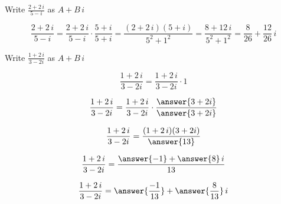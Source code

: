 \documentclass{ximera}
\begin{document}
\begin{example}




Write $\frac{2 + 2 \, i}{5 - i}$ as $A + B \, i$


\begin{explanation}

\[
\frac{2 + 2 \, i}{5 - i} = \frac{2 + 2 \, i}{5 - i} \cdot \frac{5 + i}{5 + i} = \frac{(2 + 2 \, i)(5 + i)}{5^2 + 1^2} = \frac{8 + 12 \, i}{5^2 + 1^2} = \frac{8}{26} + \frac{12}{26} \, i
\]


\end{explanation}


\end{example}










\begin{question}


Write $\frac{1 + 2 \, i}{3 - 2i}$ as $A + B \, i$



\[
\frac{1 + 2 \, i}{3 - 2i} = \frac{1 + 2 \, i}{3 - 2i} \cdot  1
\]


\[
\frac{1 + 2 \, i}{3 - 2i} = \frac{1 + 2 \, i}{3 - 2i} \cdot  \frac{\answer{3 + 2i}}{\answer{3 + 2i}}
\]


\[
\frac{1 + 2 \, i}{3 - 2i} = \frac{(1 + 2 \, i)(3 + 2i)}{\answer{13}} 
\]


\[
\frac{1 + 2 \, i}{3 - 2i} = \frac{\answer{-1} + \answer{8} \, i}{13} 
\]


\[
\frac{1 + 2 \, i}{3 - 2i} = \answer{\frac{-1}{13}} + \answer{\frac{8}{13}} \, i
\]

\end{question}
\end{document}
